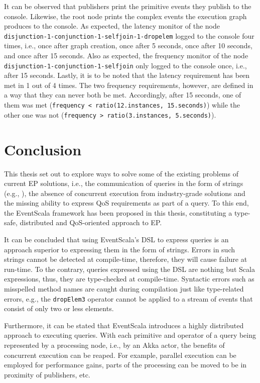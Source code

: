 \documentclass[article, 10pt, type=bsc, colorback, accentcolor=tud8b, parskip=half, bibliography=totocnumbered]{tudthesis}
\begin{document}
It can be observed that publishers print the primitive events they publish to the console.
Likewise, the root node prints the complex events the execution graph produces to the console.
As expected, the latency monitor of the node \lstinline{disjunction-1-conjunction-1-selfjoin-1-dropelem} logged to the console four times, i.e., once after graph creation, once after 5 seconds, once after 10 seconds, and once after 15 seconds.
Also as expected, the frequency monitor of the node \lstinline{disjunction-1-conjunction-1-selfjoin} only logged to the console once, i.e., after 15 seconds.
Lastly, it is to be noted that the latency requirement has been met in 1 out of 4 times.
The two frequency requirements, however, are defined in a way that they can never both be met.
Accordingly, after 15 seconds, one of them was met (\lstinline{frequency < ratio(12.instances, 15.seconds)}) while the other one was not (\lstinline{frequency > ratio(3.instances, 5.seconds)}).

\newpage

\section{Conclusion}
\label{sec:conclusion}

This thesis set out to explore ways to solve some of the existing problems of current EP solutions, i.e., the communication of queries in the form of strings (e.g., \cite{esper}), the absence of concurrent execution from industry-grade solutions \cite{Schilling:2010:DHE:1827418.1827453} and the missing ability to express QoS requirements as part of a query.
To this end, the EventScala framework has been proposed in this thesis, constituting a type-safe, distributed and QoS-oriented approach to EP.

It can be concluded that using EventScala's DSL to express queries is an approach superior to expressing them in the form of strings.
Errors in such strings cannot be detected at compile-time, therefore, they will cause failure at run-time.
To the contrary, queries expressed using the DSL are nothing but Scala expressions, thus, they are type-checked at compile-time.
Syntactic errors such as misspelled method names are caught during compilation just like type-related errors, e.g., the \lstinline{dropElem3} operator cannot be applied to a stream of events that consist of only two or less elements.

Furthermore, it can be stated that EventScala introduces a highly distributed approach to executing queries.
With each primitive and operator of a query being represented by a processing node, i.e., by an Akka actor, the benefits of concurrent execution can be reaped.
For example, parallel execution can be employed for performance gains, parts of the processing can be moved to be in proximity of publishers, etc.
\end{document}
